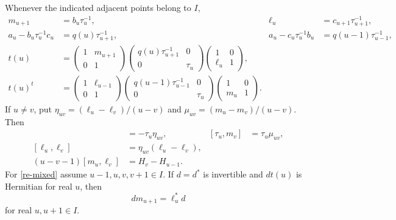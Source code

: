 \begin{lemma}\label{re-gauss}
Whenever the indicated adjacent points belong to \(I\),
\begin{align}
 m_{u+1}&=b_u\tau_u^{-1},&
 \ell_u&=c_{u+1}\tau_{u+1}^{-1},               \label{re-shifts}\\
 a_u-b_u\tau_u^{-1}c_u&=q(u)\tau_{u+1}^{-1},&
 a_u-c_u\tau_u^{-1}b_u&=q(u-1)\tau_{u-1}^{-1},\label{re-schur}\\
 t(u)&=
 \begin{pmatrix}1&m_{u+1}\\0&1\end{pmatrix}
 \begin{pmatrix}q(u)\tau_{u+1}^{-1}&0\\0&\tau_u\end{pmatrix}
 \begin{pmatrix}1&0\\\ell_u&1\end{pmatrix},     \label{re-gauss-plus}\\
 t(u)^t&=
 \begin{pmatrix}1&\ell_{u-1}\\0&1\end{pmatrix}
 \begin{pmatrix}q(u-1)\tau_{u-1}^{-1}&0\\0&\tau_u\end{pmatrix}
 \begin{pmatrix}1&0\\m_u&1\end{pmatrix}.        \label{re-gauss-minus}
\end{align}
If \(u\ne v\), put
\(\eta_{uv}=(\ell_u-\ell_v)/(u-v)\) and
\(\mu_{uv}=(m_u-m_v)/(u-v)\).  Then
\begin{align}
 [\tau_u,\ell_v]&=-\tau_u\eta_{uv},&
 [\tau_u,m_v]&=\tau_u\mu_{uv},                 \label{re-gauss-comm}\\
 [\ell_u,\ell_v]&=\eta_{uv}(\ell_u-\ell_v),    \label{re-ell-comm}\\
 (u-v-1)[m_u,\ell_v]&=H_v-H_{u-1}.            \label{re-mixed}
\end{align}
For \eqref{re-mixed} assume \(u-1,u,v,v+1\in I\).
If \(d=d^*\) is invertible and \(dt(u)\) is Hermitian for real
\(u\), then
\begin{equation}
             dm_{u+1}=\ell_u^*d                 \label{re-adj-gauss}
\end{equation}
for real \(u,u+1\in I\).
\end{lemma}

